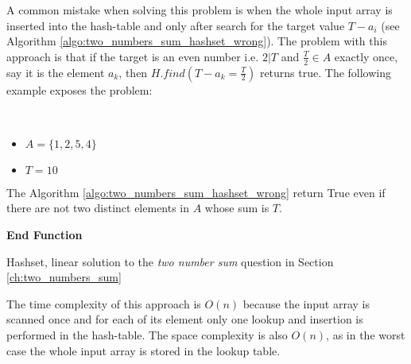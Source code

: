 

A common mistake when solving this problem is when the whole input array is inserted into the hash-table and only after search for the target value $T-a_i$ (see Algorithm \ref{algo:two_numbers_sum_hashset_wrong}). The problem with this approach is that if the target is an even number i.e. $ 2 | T$ and $\frac{T}{2} \in A$ exactly once, say it is the element $a_k$, then $H.find(T-a_k=\frac{T}{2})$ returns true. The following example exposes the problem:
\begin{example}
	\hfill \\ 
	\begin{itemize}
		\item[] $A=\{1,2,5,4\}$
	\item[] $T = 10$
\end{itemize}
The Algorithm \ref{algo:two_numbers_sum_hashset_wrong} return True even if there are not two distinct elements in $A$ whose sum is $T$.
\end{example}



\begin{algorithm}
	
	\textbf{End Function}
	\label{algo:two_numbers_sum_hashset_wrong}
	\caption{Hashset, linear solution to the \textit{two number sum} question in Section \ref{ch:two_numbers_sum} }
\end{algorithm}
The time complexity of this approach is $O(n)$ because the input array is scanned once and for each of its element only one lookup and insertion is performed in the hash-table.  The space complexity is also $O(n)$, as in the worst case the whole input array is stored in the lookup table.

